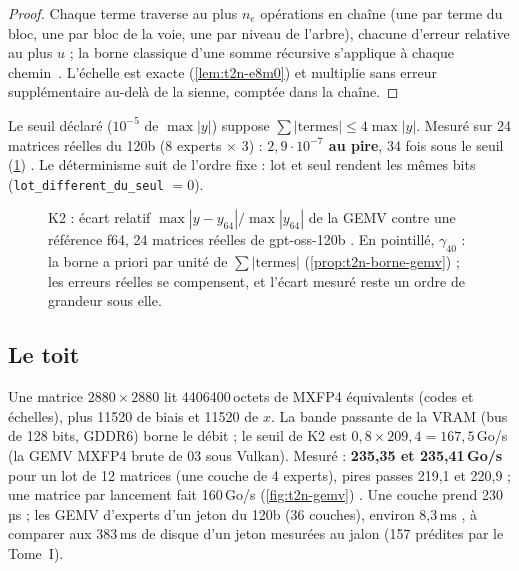 \begin{proof}
Chaque terme traverse au plus $n_e$ opérations en chaîne (une par terme du bloc, une par bloc de la voie, une par niveau de l'arbre), chacune d'erreur relative au plus $u$ ; la borne classique d'une somme récursive s'applique à chaque chemin~\cite{higham2002}. L'échelle est exacte (\cref{lem:t2n-e8m0}) et multiplie sans erreur supplémentaire au-delà de la sienne, comptée dans la chaîne.
\end{proof}

Le seuil déclaré ($10^{-5}$ de $\max|y|$) suppose $\sum|\text{termes}| \le 4 \max|y|$. Mesuré sur 24 matrices réelles du 120b (8 experts $\times$ 3) : \textbf{$2{,}9\cdot10^{-7}$ au pire}, 34 fois sous le seuil (\cref{fig:t2n-ecarts}) \mes. Le déterminisme suit de l'ordre fixe : lot et seul rendent les mêmes bits (\texttt{lot\_\allowbreak different\_\allowbreak du\_\allowbreak seul} $= 0$).

\begin{figure}[!htbp]
\centering
\GrapheNoyEcarts
\caption[K2 : écart de la GEMV sur poids réels]{K2 : écart relatif $\max|y - y_{64}| / \max|y_{64}|$ de la GEMV contre une référence f64, 24 matrices réelles de gpt-oss-120b \mes. En pointillé, $\gamma_{40}$ : la borne a priori par unité de $\sum|\text{termes}|$ (\cref{prop:t2n-borne-gemv}) ; les erreurs réelles se compensent, et l'écart mesuré reste un ordre de grandeur sous elle.}
\label{fig:t2n-ecarts}
\end{figure}

\subsection{Le toit}

Une matrice $\num{2880} \times \num{2880}$ lit \num{4406400}\,octets de MXFP4 équivalents (codes et échelles), plus \num{11520} de biais et \num{11520} de $x$. La bande passante de la VRAM (bus de 128 bits, GDDR6) borne le débit ; le seuil de K2 est $0{,}8 \times 209{,}4 = 167{,}5$\,Go/s (la GEMV MXFP4 brute de 03 sous Vulkan). Mesuré : \textbf{235,35 et 235,41\,Go/s} pour un lot de 12 matrices (une couche de 4 experts), pires passes 219,1 et 220,9 ; une matrice par lancement fait 160\,Go/s (\cref{fig:t2n-gemv}) \mes. Une couche prend 230\,µs ; les GEMV d'experts d'un jeton du 120b (36 couches), environ 8,3\,ms \calc, à comparer aux 383\,ms de disque d'un jeton mesurées au jalon (157 prédites par le Tome~I).

